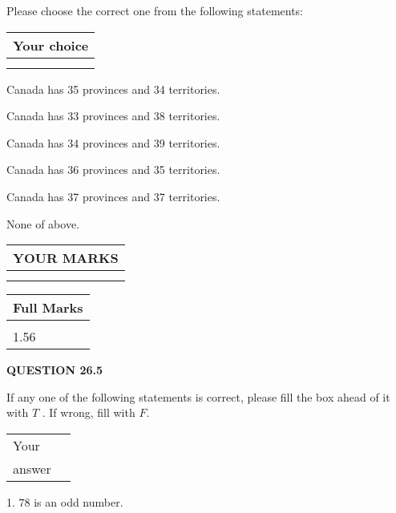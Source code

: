 \documentclass[12pt]{article}
\begin{document}
  
Please choose the correct one from the following statements:
  
  
\noindent\hspace{3.0in} \begin{tabular}{|l|}
\hline
Your choice \\
\hline
 \\ 
 \\ 
\hline
\end{tabular}
  
  
 
 
Canada has  %
35 provinces and  %
34 territories.
 
 
Canada has  %
33 provinces and  %
38 territories.
 
 
Canada has  %
34 provinces and  %
39 territories.
 
 
Canada has  %
36 provinces and  %
35 territories.
 
 
Canada has  %
37 provinces and  %
37 territories.
 
 
 None of above.
 
 
  
\vspace{0.2in}
  
\noindent\begin{tabular}{|l|}
\hline
 YOUR MARKS  \\
\hline
 \\ 
 \\ 
\hline
\end{tabular}
\hspace{0.05in} \begin{tabular}{|l|}
\hline
 Full Marks  \\
\hline
 \\ 
1.56 \\
\hline
\end{tabular}
{\textbf{\Large{QUESTION
26.5 
}}}
  
  
If any one of the following statements is correct, please fill the box ahead of it with $T$ .
If wrong, fill with $F$.
 
\noindent\begin{tabular}{|l|l|}\hline Your&\hspace{.2in} \\ answer&\hspace{.2in} \\ \hline \end{tabular}
1. $ %
78$ is an  %
odd number.
 
\end{document}
